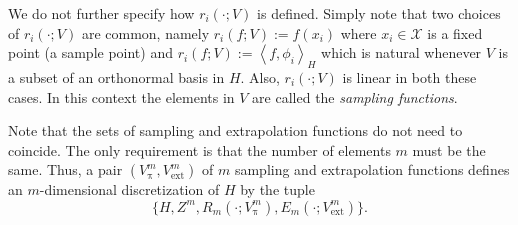 \documentclass[a4paper]{paper}
\newcommand{\Spc}[1]{\mathscr{#1}}
\DeclareMathOperator{\rest}{\pi}
\newcommand{\ip}[2]{\left \langle #1,#2 \right\rangle}
\newcommand{\ext}{\text{ext}}
\begin{document}
We do not further specify how $r_{i}(\cdot;V)$ is defined.
    Simply note that two choices of $r_{i}(\cdot;V)$ are common, namely
    $r_{i}(f;V):=f(x_{i})$ where $x_{i}\in \Spc{X}$ is a fixed point (a sample 
    point) and $r_{i}(f;V):=\ip{f}{\phi_{i}}_{H}$ which is natural whenever
    $V$ is a subset of an orthonormal basis in $H$. Also, 
    $r_{i}(\cdot;V)$ is linear in both these cases.
    In this context the elements in $V$ are called the 
    \emph{sampling functions}.

Note that the sets of sampling and extrapolation functions do not 
need to coincide.  The only requirement is that the number of 
elements $m$ must be the same. Thus, a pair 
$(V^m_{\rest},V^m_{\ext})$ of $m$ 
sampling and extrapolation functions defines an $m$-dimensional 
discretization of $H$ by the tuple
\[ \bigl\{
     H,Z^m,R_{m}(\cdot;V^m_{\rest}),E_{m}(\cdot;V^m_{\ext})
   \bigr\}. \]
   
\end{document}
